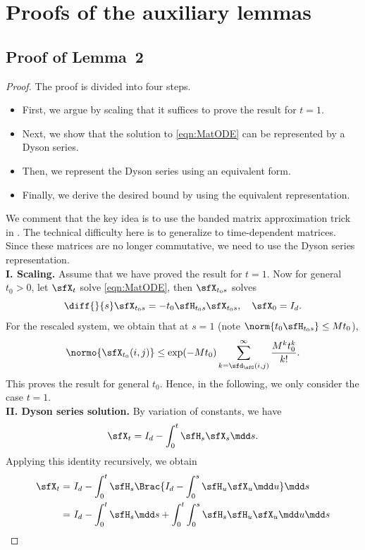 \documentclass[11pt]{article}
\begin{document}
\section{Proofs of the auxiliary lemmas}
\label{app:lemmas_1}

\subsection{Proof of Lemma~2}
\label{app:diff_ctrl}

\begin{proof}
The proof is divided into four steps.
\begin{itemize}
    \item First, we argue by scaling that it suffices to prove the result for $t=1$.
    \item Next, we show that the solution to \eqref{eqn:MatODE} can be represented by a Dyson series.
    \item Then, we represent the Dyson series using an equivalent form.
    \item Finally, we derive the desired bound by using the equivalent representation.
\end{itemize}
We comment that the key idea is to use the banded matrix approximation trick in \cite{MR758197}. The technical difficulty here is to generalize to time-dependent matrices. Since these matrices are no longer commutative, we need to use the Dyson series representation.
%
\ \\[5pt]
\noindent
{\bf I. Scaling.}
Assume that we have proved the result for $t=1$. Now for general $t_0 > 0$, let $\sfX_t$ solve \eqref{eqn:MatODE}, then $\sfX_{t_0 s}$ solves
\[
    \diff{}{s} \sfX_{t_0s} = - t_0 \sfH_{t_0s} \sfX_{t_0s}, \quad \sfX_0 = I_d.
\]
For the rescaled system, we obtain that at $s=1$ (note $\norm{t_0\sfH_{t_0s}} \le Mt_0$),
\[
    \normo{ \sfX_{t_0}(i,j) } \le \exp(-Mt_0) \sum_{k=\sfd_\sfG(i,j)}^\infty \frac{M^k t_0^k}{k!}.
\]
This proves the result for general $t_0$. Hence, in the following, we only consider the case $t=1$.
%
\ \\[5pt]
%
{\bf II. Dyson series solution.}
By variation of constants, we have
\[
    \sfX_t = I_d - \int_0^t \sfH_s \sfX_s \mdd s.
\]
Applying this identity recursively, we obtain
\begin{align*}
    \sfX_t =~& I_d - \int_0^t \sfH_s \Brac{ I_d - \int_0^s \sfH_u \sfX_u \mdd u } \mdd s \\
    =~& I_d - \int_0^t \sfH_s \mdd s + \int_0^t \int_0^s \sfH_s \sfH_u \sfX_u \mdd u \mdd s \\ %

\end{align*}
\end{proof}
\end{document}
